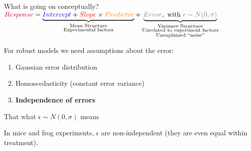\documentclass{beamer}
\begin{document}
\begin{frame}{What is going on conceptually?}
 $
{\color{purple}{Response}} = \underbrace{{\color{blue}{Intercept}} + {\color{red}{Slope}} \times {\color{orange}{Predictor}}}_{\substack{\text{Mean Structure} \\ \text{Experimental factors}}} + \underbrace{{\color{gray}{Error}}, \text{ with } {\color{gray}{\epsilon \sim N(0,\sigma)}}}_{\substack{\text{Variance Structure} \\ \text{Unrelated to experiment factors} \\ \text{Unexplained ``noise''}}}
$
\pause

\begin{alertblock}{For robust models we need assumptions about the error:}
 \begin{enumerate}
  \item Gaussian error distribution
  \item Homoscedasticity (constant error variance)
  \item \textbf{Independence of errors}
 \end{enumerate}
 
 That what $\epsilon \sim N(0,\sigma)$ means
\end{alertblock}

\pause

In mice and frog experiments, $\epsilon$ are non-independent (they are even equal within treatment).

\end{frame}


\end{document}
